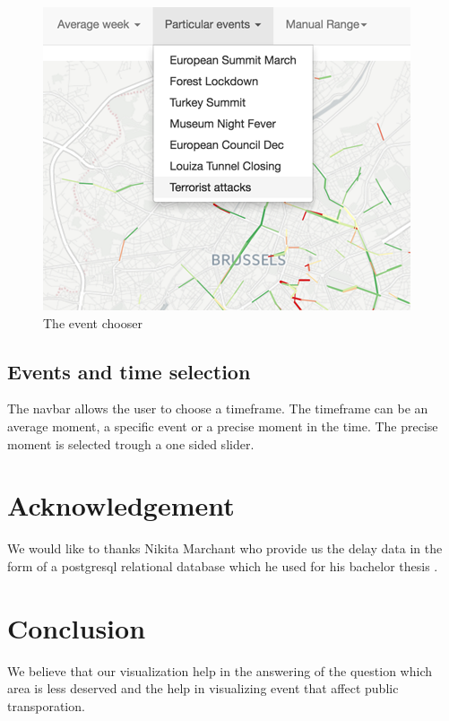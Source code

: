 \documentclass[11pt]{article}%
\begin{document}
\begin{minipage}{0.3\textwidth}
  \begin{figure}[H]
    \includegraphics[width=\textwidth]{images/topbar.png}
    \caption{\label{fig:popup} The event chooser}
  \end{figure}
\end{minipage}\hfill
\begin{minipage}{0.6\textwidth}
  \subsection{Events and time selection}
  
  The navbar allows the user to choose a timeframe. The timeframe can be an average moment, a specific event or a precise moment in the time. The precise moment is selected trough a one sided slider.
\end{minipage}

\section{Acknowledgement}

We would like to thanks Nikita Marchant who provide us the delay data in the form of a postgresql relational database which he used for his bachelor thesis \cite{nikita}. 

\section{Conclusion}
We believe that our visualization help in the answering of the question which area is less deserved and the help in visualizing event that affect public transporation. 
\end{document}
